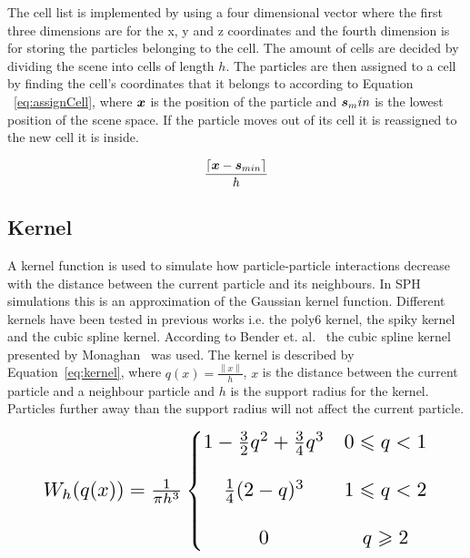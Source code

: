     The cell list is implemented by using a four dimensional vector where the first three dimensions are for the x, y and z coordinates and the fourth dimension is for storing the particles belonging to the cell.
    The amount of cells are decided by dividing the scene into cells of length $h$.
    The particles are then assigned to a cell by finding the cell's coordinates that it belongs to according to Equation ~\ref{eq:assignCell}, where $\bm{x}$ is the position of the particle and $\bm{s}_min$ is the lowest position of the scene space.
    If the particle moves out of its cell it is reassigned to the new cell it is inside.

    \begin{equation} \label{eq:assignCell}
        \frac{\lceil{\bm{x} - \bm{s}_{min}}\rceil}{h}
    \end{equation}

\subsection{Kernel} \label{kernel}
    A kernel function is used to simulate how particle-particle interactions decrease with the distance between the current particle and its neighbours. In SPH simulations this is an approximation of the Gaussian kernel function. Different kernels have been tested in previous works i.e. the poly6 kernel, the spiky kernel and the cubic spline kernel. According to Bender et. al.~\cite{bender} the cubic spline kernel presented by Monaghan~\cite{monaghan} was used. The kernel is described by Equation~\ref{eq:kernel}, where $q(x)=\frac{\left \| x \right \|}{h}$, $x$ is the distance between the current particle and a neighbour particle and $h$ is the support radius for the kernel. Particles further away than the support radius will not affect the current particle.   

    \begin{equation} \label{eq:kernel}
        \resizebox{0.88\linewidth}{!}{$
        W_h(q(x)) =  \frac{1}{\pi h^3} \left\{\begin{matrix}
        1 - \frac{3}{2}q^2 + \frac{3}{4}q^3 & 0 \leqslant q < 1 \\ 
        \\
        \frac{1}{4}(2-q)^3 & 1 \leqslant q < 2\\ 
        \\
        0 & q \geqslant 2
        \end{matrix}\right.
        $}
    \end{equation}

